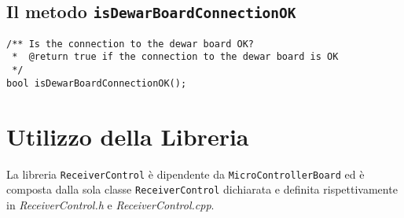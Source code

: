 \subsection{Il metodo \texttt{isDewarBoardConnectionOK}}
\lstset{language=C++}
\begin{lstlisting}[caption={Dichiarazione del metodo \texttt{isDewarBoardConnectionOK}},
label=lst:isDewarBoardConnectionOK,mathescape]
/** Is the connection to the dewar board OK?
 *  @return true if the connection to the dewar board is OK
 */
bool isDewarBoardConnectionOK();
\end{lstlisting}
\lstset{numbers=none}


\section{Utilizzo della Libreria}
La libreria \texttt{ReceiverControl} \`e dipendente da \texttt{MicroControllerBoard}
ed \`e composta dalla sola classe \texttt{ReceiverControl} dichiarata e definita rispettivamente
in \emph{ReceiverControl.h} e \emph{ReceiverControl.cpp}.

